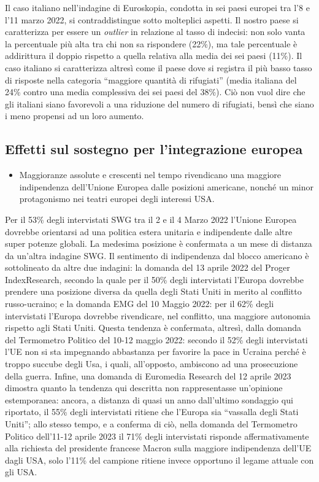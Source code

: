\documentclass[
]{book}
\providecommand{\tightlist}{%
  \setlength{\itemsep}{0pt}\setlength{\parskip}{0pt}}
\begin{document}
Il caso italiano nell'indagine di Euroskopia, condotta in sei paesi europei tra l'8 e l'11 marzo 2022, si contraddistingue sotto molteplici aspetti. Il nostro paese si caratterizza per essere un \emph{outlier} in relazione al tasso di indecisi: non solo vanta la percentuale più alta tra chi non sa rispondere (22\%), ma tale percentuale è addirittura il doppio rispetto a quella relativa alla media dei sei paesi (11\%).
Il caso italiano si caratterizza altresì come il paese dove si registra il più basso tasso di risposte nella categoria ``maggiore quantità di rifugiati'' (media italiana del 24\% contro una media complessiva dei sei paesi del 38\%). Ciò non vuol dire che gli italiani siano favorevoli a una riduzione del numero di rifugiati, bensì che siano i meno propensi ad un loro aumento.

\hypertarget{effetti-sul-sostegno-per-lintegrazione-europea}{%
\subsection{Effetti sul sostegno per l'integrazione europea}\label{effetti-sul-sostegno-per-lintegrazione-europea}}

\begin{itemize}
\tightlist
\item
  Maggioranze assolute e crescenti nel tempo rivendicano una maggiore indipendenza dell'Unione Europea dalle posizioni americane, nonché un minor protagonismo nei teatri europei degli interessi USA.
\end{itemize}

Per il 53\% degli intervistati SWG tra il 2 e il 4 Marzo 2022 l'Unione Europea dovrebbe orientarsi ad una politica estera unitaria e indipendente dalle altre super potenze globali. La medesima posizione è confermata a un mese di distanza da un'altra indagine SWG. Il sentimento di indipendenza dal blocco americano è sottolineato da altre due indagini: la domanda del 13 aprile 2022 del Proger IndexResearch, secondo la quale per il 50\% degli intervistati l'Europa dovrebbe prendere una posizione diversa da quella degli Stati Uniti in merito al conflitto russo-ucraino; e la domanda EMG del 10 Maggio 2022: per il 62\% degli intervistati l'Europa dovrebbe rivendicare, nel conflitto, una maggiore autonomia rispetto agli Stati Uniti. Questa tendenza è confermata, altresì, dalla domanda del Termometro Politico del 10-12 maggio 2022: secondo il 52\% degli intervistati l'UE non si sta impegnando abbastanza per favorire la pace in Ucraina perché è troppo succube degli Usa, i quali, all'opposto, ambiscono ad una prosecuzione della guerra. Infine, una domanda di Euromedia Research del 12 aprile 2023 dimostra quanto la tendenza qui descritta non rappresentasse un'opinione estemporanea: ancora, a distanza di quasi un anno dall'ultimo sondaggio qui riportato, il 55\% degli intervistati ritiene che l'Europa sia ``vassalla degli Stati Uniti''; allo stesso tempo, e a conferma di ciò, nella domanda del Termometro Politico dell'11-12 aprile 2023 il 71\% degli intervistati risponde affermativamente alla richiesta del presidente francese Macron sulla maggiore indipendenza dell'UE dagli USA, solo l'11\% del campione ritiene invece opportuno il legame attuale con gli USA.
\end{document}
